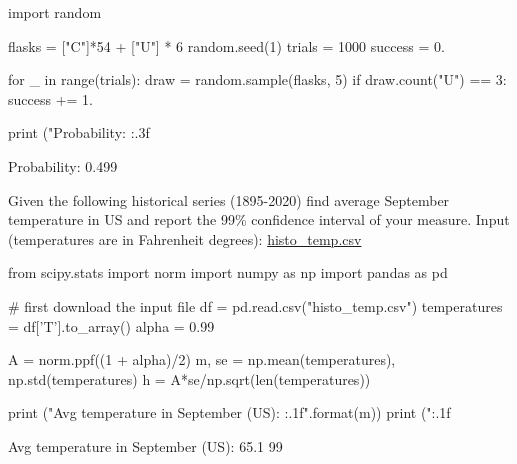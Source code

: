 \cprotEnv\begin{solution}
\begin{ipython}
import random

flasks = ["C"]*54 + ["U"] * 6
random.seed(1)
trials = 1000
success = 0.

for _ in range(trials):
    draw = random.sample(flasks, 5)
    if draw.count("U") == 3:
        success += 1.

print ("Probability: {:.3f}%
\end{ipython}
\begin{ioutput}
Probability: 0.499%
\end{ioutput}
\end{solution}

\begin{question}
Given the following historical series (1895-2020) find average September temperature in US and report the 99\% confidence interval of your measure.
\noindent
Input (temperatures are in Fahrenheit degrees): \href{https://raw.githubusercontent.com/matteosan1/finance_course/develop/libro/input_files/histo_temp.csv}{histo\_temp.csv}
\end{question}

\cprotEnv\begin{solution}
\begin{ipython}
from scipy.stats import norm
import numpy as np
import pandas as pd

# first download the input file
df = pd.read.csv("histo_temp.csv")
temperatures = df['T'].to_array()
alpha = 0.99

A = norm.ppf((1 + alpha)/2)
m, se = np.mean(temperatures), np.std(temperatures)
h = A*se/np.sqrt(len(temperatures))

print ("Avg temperature in September (US): {:.1f}".format(m))
print ("{:.1f}%
\end{ipython}
\begin{ioutput}
Avg temperature in September (US): 65.1
99%
\end{ioutput}
\end{solution}


